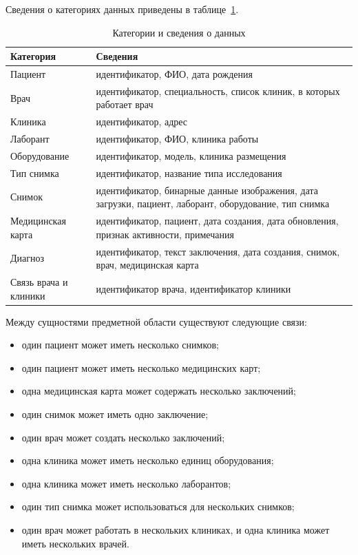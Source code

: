Сведения о категориях данных приведены в таблице~\ref{tab:data-categories}.

\begin{table}[H]
	\caption{Категории и сведения о данных}
	\label{tab:data-categories}
	\centering
	\small
	\begin{tabular}{|p{}|p{}|}
		\hline
		Категория & Сведения \\
		\hline
		Пациент & идентификатор, ФИО, дата рождения \\
		\hline
		Врач & идентификатор, специальность, список клиник, в которых работает врач \\
		\hline
		Клиника & идентификатор, адрес \\
		\hline
		Лаборант & идентификатор, ФИО, клиника работы \\
		\hline
		Оборудование & идентификатор, модель, клиника размещения \\
		\hline
		Тип снимка & идентификатор, название типа исследования \\
		\hline
		Снимок & идентификатор, бинарные данные изображения, дата загрузки, пациент, лаборант, оборудование, тип снимка \\
		\hline
		Медицинская карта & идентификатор, пациент, дата создания, дата обновления, признак активности, примечания \\
		\hline
		Диагноз & идентификатор, текст заключения, дата создания, снимок, врач, медицинская карта \\
		\hline
		Связь врача и клиники & идентификатор врача, идентификатор клиники \\
		\hline
	\end{tabular}
\end{table}

Между сущностями предметной области существуют следующие связи:
\begin{itemize}
	\item один пациент может иметь несколько снимков;
	\item один пациент может иметь несколько медицинских карт;
	\item одна медицинская карта может содержать несколько заключений;
	\item один снимок может иметь одно заключение;
	\item один врач может создать несколько заключений;
	\item одна клиника может иметь несколько единиц оборудования;
	\item одна клиника может иметь несколько лаборантов;
	\item один тип снимка может использоваться для нескольких снимков;
	\item один врач может работать в нескольких клиниках, и одна клиника может иметь нескольких врачей.
\end{itemize}

